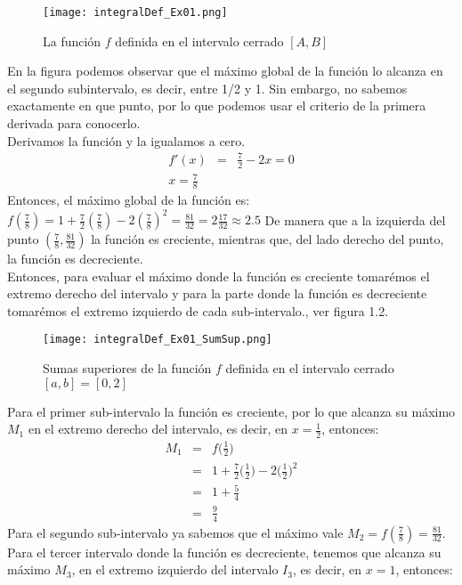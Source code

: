 \begin{ejer}[1]
\begin{figure}[h]
				\texttt{[image: integralDef\_Ex01.png]}
				\caption{La función $f$ definida en el intervalo cerrado $[A,B]$}
			\end{figure}
			En la figura podemos observar que el máximo global de la función lo alcanza en el segundo subintervalo, es decir, entre 1/2 y 1. Sin embargo, no sabemos exactamente en que punto, por lo que podemos usar el criterio de la primera derivada para conocerlo. \\ 
			Derivamos la función y la igualamos a cero. 
			\begin{eqnarray*}
				f'(x) &=& \frac{7}{2} - 2 x = 0 \\ 
					x = \frac{7}{8} 
			\end{eqnarray*}
			Entonces, el máximo global de la función es: $f(\frac{7}{8}) = 1 + \frac{7}{2}(\frac{7}{8}) - 2 (\frac{7}{8})^2 = \frac{81}{32} = 2\frac{17}{32} \approx 2.5 $
			De manera que a la izquierda del punto $(\frac{7}{8}, \frac{81}{32})$ la función es creciente, mientras que, del lado derecho del punto, la función es decreciente. \\ Entonces, para evaluar el máximo donde la función es creciente tomarémos el extremo derecho del intervalo y para la parte donde la función es decreciente tomarémos el extremo izquierdo de cada sub-intervalo., ver figura 1.2. \\
			\begin{figure}[h]\label{sumasSup}
				\texttt{[image: integralDef\_Ex01\_SumSup.png]}
				\caption{Sumas superiores de la función $f$ definida en el intervalo cerrado $[a,b] = [0,2]$}
			\end{figure}
			Para el primer sub-intervalo la función es creciente, por lo que alcanza su máximo $M_1$ en el extremo derecho del intervalo, es decir, en $x=\frac{1}{2}$, entonces:
			\begin{eqnarray*}
				M_1 &=& f\Big(\frac{1}{2}\Big) \\
				&=& 1 + \frac{7}{2}\Big(\frac{1}{2}\Big) - 2\Big(\frac{1}{2}\Big)^2 \\ 
				&=& 1 + \frac{5}{4} \\ 
				&=& \frac{9}{4}
			\end{eqnarray*}
			Para el segundo sub-intervalo ya sabemos que el máximo vale $M_2 = f(\frac{7}{8}) = \frac{81}{32}$.\\ Para el tercer intervalo donde la función es decreciente, tenemos que alcanza su máximo $M_3$, en el extremo izquierdo del intervalo $I_3$, es decir, en $x = 1$, entonces: 

\end{ejer}

